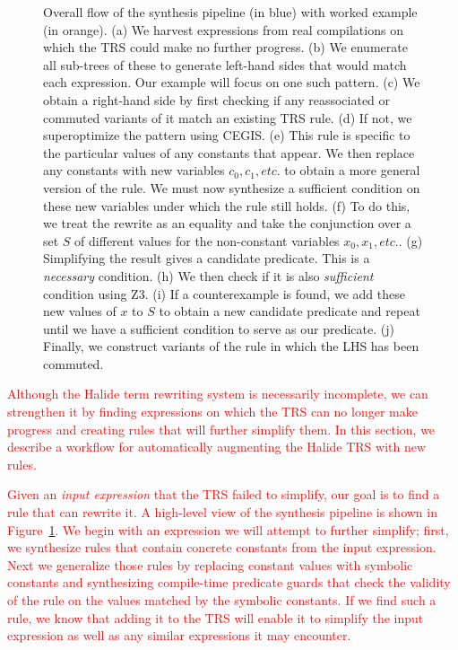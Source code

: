 \documentclass[acmsmall,review]{acmart}\settopmatter{printfolios=true,printccs=false,printacmref=false}
\newcommand{\modified}[1]{\textcolor{red}{{#1}}}
\begin{document}
\begin{figure}
  \caption{Overall flow of the synthesis pipeline (in blue) with worked example (in orange). (a) We harvest expressions from real compilations on which the TRS could make no further progress. (b) We enumerate all sub-trees of these to generate left-hand sides that would match each expression. Our example will focus on one such pattern. (c) We obtain a right-hand side by first checking if any reassociated or commuted variants of it match an existing TRS rule. (d) If not, we superoptimize the pattern using CEGIS. (e) This rule is specific to the particular values of any constants that appear. We then replace any constants with new variables $c_0, c_1, etc.$ to obtain a more general version of the rule. We must now synthesize a sufficient condition on these new variables under which the rule still holds. (f) To do this, we treat the rewrite as an equality and take the conjunction over a set $S$ of different values for the non-constant variables $x_0, x_1, etc.$. (g) Simplifying the result gives a candidate predicate. This is a \emph{necessary} condition. (h) We then check if it is also \emph{sufficient} condition using Z3. (i) If a counterexample is found, we add these new values of $x$ to $S$ to obtain a new candidate predicate and repeat until we have a sufficient condition to serve as our predicate. (j) Finally, we construct variants of the rule in which the LHS has been commuted.}
\label{fig:synthesis-flow}
\end{figure}


\modified{Although the Halide term rewriting system is necessarily incomplete, we can strengthen 
it by finding expressions on which the TRS can no longer make progress and creating 
rules that will further simplify them.
In this section, we describe a workflow for automatically augmenting the Halide TRS with new rules.}

\modified{Given an \emph{input expression} that the TRS failed to simplify, our goal is to find a rule that
can rewrite it. A high-level view of the synthesis pipeline is shown in Figure~\ref{fig:synthesis-flow}.
We begin with an expression we will attempt to further simplify; 
first, we synthesize rules that contain concrete constants from the input expression. 
Next we generalize those rules by replacing constant values with symbolic constants and synthesizing compile-time 
predicate guards 
that check the validity of the rule on the values matched by the symbolic constants. If we 
find such a rule, we know that adding it to the TRS will enable it to simplify the input
expression as well as any similar expressions it may encounter.}
\end{document}
